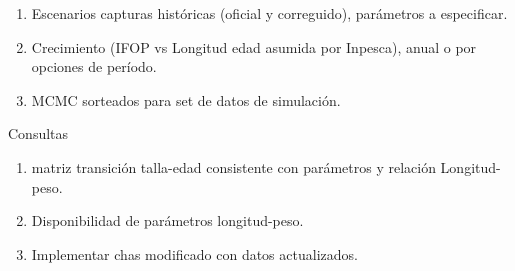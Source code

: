 \documentclass[]{article}
\begin{document}
\begin{enumerate}
\def\labelenumi{\alph{enumi}.}
\item
  Escenarios capturas históricas (oficial y correguido), parámetros a
  especificar.
\item
  Crecimiento (IFOP vs Longitud edad asumida por Inpesca), anual o por
  opciones de período.
\item
  MCMC sorteados para set de datos de simulación.
\end{enumerate}

Consultas

\begin{enumerate}
\def\labelenumi{\arabic{enumi})}
\item
  matriz transición talla-edad consistente con parámetros y relación
  Longitud-peso.
\item
  Disponibilidad de parámetros longitud-peso.
\item
  Implementar chas modificado con datos actualizados.
\end{enumerate}
\end{document}
